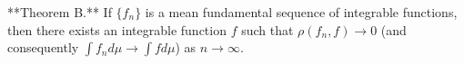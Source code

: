 **Theorem B.** If $\{f_n\}$ is a mean fundamental sequence of integrable functions, then there exists an integrable function $f$ such that $\rho(f_n, f) \to 0$ (and consequently $\int f_n d\mu \to \int f d\mu$) as $n \to \infty$.

